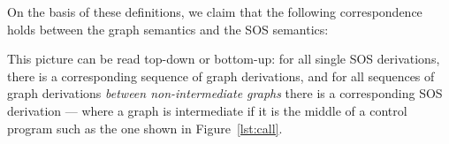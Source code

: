 On the basis of these definitions, we claim that the following correspondence holds
between the graph semantics and the SOS semantics:
\begin{center}
\end{center}
This picture can be read top-down or bottom-up: for all single SOS derivations,
there is a corresponding sequence of graph derivations, and for all sequences
of graph derivations \emph{between non-intermediate graphs} there is a
corresponding SOS derivation --- where a graph is intermediate if it is the
middle of a control program such as the one shown in Figure~\ref{lst:call}.
%
